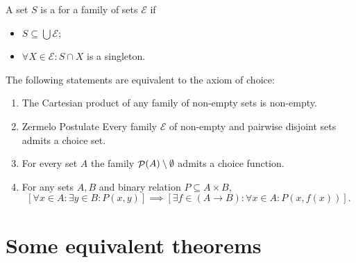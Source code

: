\begin{definition}
A set $S$ is a  for a family of sets $\mathcal{E}$ if
\begin{itemize}
\item $S\subseteq \bigcup \mathcal{E}$;
\item $\forall X \in \mathcal{E}: S\cap X$ is a singleton.
\end{itemize}
\end{definition}

\begin{proposition} \label{proposition:choiceEquivalents}
The following statements are equivalent to the axiom of choice:
\begin{enumerate}
\item The Cartesian product of any family of non-empty sets is non-empty.
\item \textup{Zermelo Postulate} Every family $\mathcal{E}$ of non-empty and pairwise disjoint sets admits a choice set.
\item For every set $A$ the family $\mathop{\mathcal{P}}(A)\setminus \emptyset$ admits a choice function.
\item For any sets $A,B$ and binary relation $P\subseteq A\times B$,
\[ \left [\forall x\in A: \exists y \in B: P(x,y)\right] \implies \left[ \exists f\in(A\to B): \forall x\in A: P(x,f(x)) \right].  \]
\end{enumerate}
\end{proposition}

\section{Some equivalent theorems}

